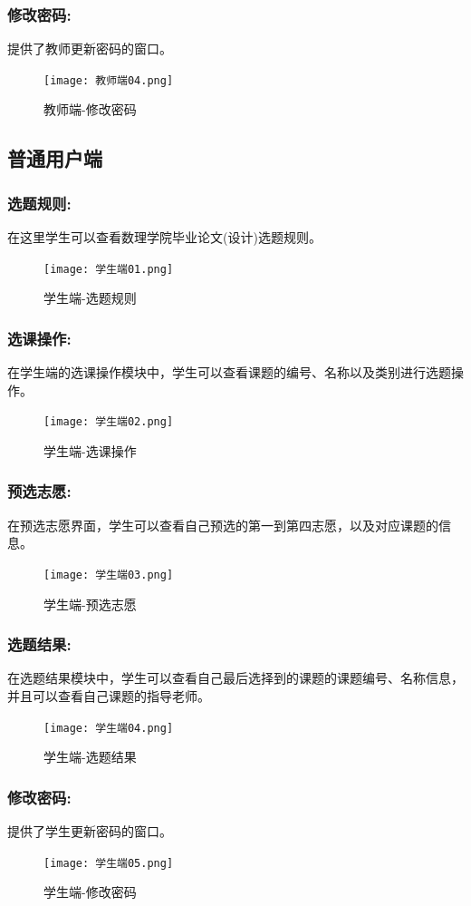 \subsubsection{修改密码:}
提供了教师更新密码的窗口。
\begin{figure}[ht]
    \centering
    \texttt{[image: 教师端04.png]}
    \caption{教师端-修改密码}
    \label{fig:teacher04}
\end{figure}


\subsection{普通用户端}
\subsubsection{选题规则:}
在这里学生可以查看数理学院毕业论文(设计)选题规则。
\begin{figure}[h]
    \centering
    \texttt{[image: 学生端01.png]}
    \caption{学生端-选题规则}
    \label{fig:student01}
\end{figure}

\subsubsection{选课操作:}
在学生端的选课操作模块中，学生可以查看课题的编号、名称以及类别进行选题操作。
\begin{figure}[h]
    \centering
    \texttt{[image: 学生端02.png]}
    \caption{学生端-选课操作}
    \label{fig:student02}
\end{figure}

\clearpage

\subsubsection{预选志愿:}
在预选志愿界面，学生可以查看自己预选的第一到第四志愿，以及对应课题的信息。
\begin{figure}[h]
    \centering
    \texttt{[image: 学生端03.png]}
    \caption{学生端-预选志愿}
    \label{fig:student03}
\end{figure}

\subsubsection{选题结果:}
在选题结果模块中，学生可以查看自己最后选择到的课题的课题编号、名称信息，
并且可以查看自己课题的指导老师。
\begin{figure}[h]
    \centering
    \texttt{[image: 学生端04.png]}
    \caption{学生端-选题结果}
    \label{fig:student04}
\end{figure}

\clearpage

\subsubsection{修改密码:}
提供了学生更新密码的窗口。
\begin{figure}[ht]
    \centering
    \texttt{[image: 学生端05.png]}
    \caption{学生端-修改密码}
    \label{fig:student05}
\end{figure}